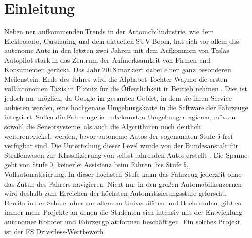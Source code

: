 \documentclass{like}
\begin{document}
  








\setcounter{page}{1}   %

\chapter{Einleitung}
Neben neu aufkommenden Trends in der Automobilindustrie, wie dem Elektroauto, Carsharing und dem aktuellen SUV-Boom, hat sich vor allem das autonome Auto in den letzten zwei Jahren mit dem Aufkommen von Teslas Autopilot stark in das Zentrum der Aufmerksamkeit von Firmen und Konsumenten gerückt. Das Jahr 2018 markiert dabei einen ganz besonderen Meilenstein. 
Ende des Jahres wird die Alphabet-Tochter Waymo die ersten vollautonomen Taxis in Phönix für die Öffentlichkeit in Betrieb nehmen \cite{Waymo:1}. 
Dies ist jedoch nur möglich, da Google im gesamten Gebiet, in dem sie ihren Service anbieten werden, eine hochgenaue Umgebungskarte in die Software der Fahrzeuge integriert. Sollen die Fahrzeuge in unbekannten Umgebungen agieren, müssen sowohl die Sensorsysteme, als auch die Algorithmen noch deutlich weiterentwickelt werden, bevor autonome Autos der sogenannten Stufe 5 frei verfügbar sind. Die Unterteilung dieser Level wurde von der Bundesanstalt für Straßenwesen zur Klassifizierung von selbst fahrenden Autos erstellt \cite{BASt5L}. Die Spanne geht von Stufe 0, keinerlei Assistenz beim Fahren, bis Stufe 5, Vollautomatisierung. In dieser höchsten Stufe kann das Fahrzeug jederzeit ohne das Zutun des Fahrers navigieren. 
Nicht nur in den großen Automobilkonzernen wird deshalb zum Erreichen der höchsten Automatisierungsstufe geforscht. Bereits in der Schule, aber vor allem an Universitäten und Hochschulen, gibt es immer mehr Projekte an denen die Studenten sich intensiv mit der Entwicklung autonomer Roboter und Fahrzeugplattformen beschäftigen. Ein solches Projekt ist der \ac{FS} Driverless-Wettbewerb.
\end{document}
